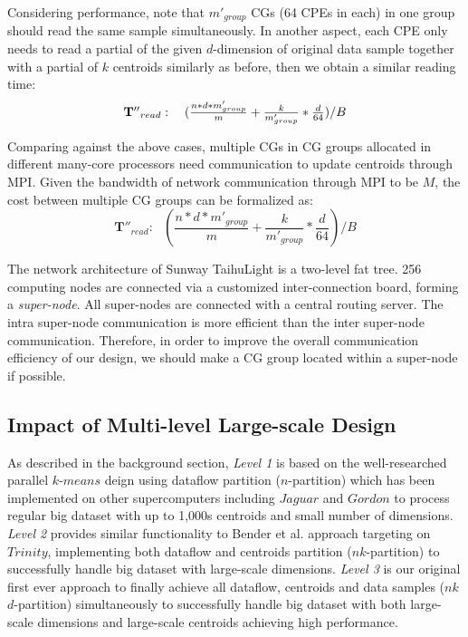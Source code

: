 \documentclass[10pt,journal,compsoc]{IEEEtran}
\begin{document}
Considering performance, note that $m'_{group}$ CGs (64 CPEs in each) in one group should read the same sample simultaneously. In another aspect, each CPE only needs to read a partial of the given $d$-dimension of original data sample together with  a partial of $k$ centroids similarly as before, then we obtain a similar reading time:  
\begin{equation}
  \label{eq:tread}
  $$\mathbf{T''}_{read}:\ \ \ (\frac{n*d*m'_{group}}{m}+\frac{k}{m'_{group}}*\frac{d}{64})/B
\end{equation}


Comparing against the above cases, multiple CGs in CG groups allocated in different many-core processors need communication to update centroids through MPI. Given the bandwidth of network communication through MPI to be $M$, the cost between multiple CG groups can be formalized as:
\begin{equation}
  \label{eq:tcomm}
  \mathbf{T''}_{read}:\ \ \ (\frac{n*d*m'_{group}}{m}+\frac{k}{m'_{group}}*\frac{d}{64})/B
\end{equation}

The network architecture of Sunway TaihuLight is a two-level fat tree. 256 computing nodes are connected via a customized inter-connection board, forming a \emph{super-node}. All super-nodes are connected with a central routing server. The intra super-node communication is more efficient than the inter super-node communication. Therefore, in order to improve the overall communication efficiency of our design, we should make a CG group located within a super-node if possible. 


\subsection{Impact of Multi-level Large-scale Design}
As described in the background section,  \textit{Level 1} is based on the well-researched parallel $k$-$means$ deign using dataflow partition ($n$-partition) which has been implemented on other supercomputers including $Jaguar$ \cite{kumar2011parallel} and $Gordon$ \cite{cai2015grouping} to process regular big dataset with up to 1,000s centroids and small number of dimensions. \textit{Level 2} provides similar functionality to Bender et al. \cite{bender2015k} approach targeting on $Trinity$, implementing both dataflow and centroids partition ($n$$k$-partition) to successfully handle big dataset with large-scale dimensions. \textit{Level 3} is our original first ever approach to finally achieve all dataflow, centroids and data samples ($n$$k$$d$-partition) simultaneously to successfully handle big dataset with both large-scale dimensions and large-scale centroids achieving high performance.  
\end{document}
